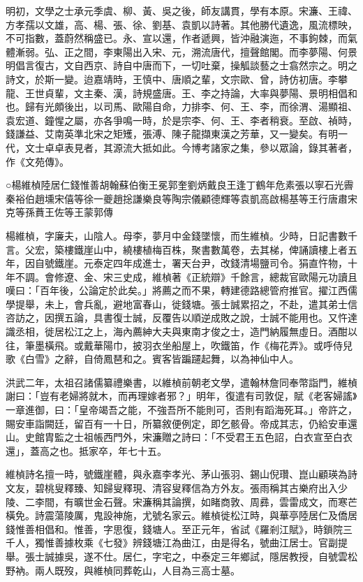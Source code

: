 
\begin{pinyinscope}
明初，文學之士承元季虞、柳、黃、吳之後，師友講貫，學有本原。宋濂、王禕、方孝孺以文雄，高、楊、張、徐、劉基、袁凱以詩著。其他勝代遺逸，風流標映，不可指數，蓋蔚然稱盛已。永、宣以還，作者遞興，皆沖融演迤，不事鉤棘，而氣體漸弱。弘、正之間，李東陽出入宋、元，溯流唐代，擅聲館閣。而李夢陽、何景明倡言復古，文自西京、詩自中唐而下，一切吐棄，操觚談藝之士翕然宗之。明之詩文，於斯一變。迨嘉靖時，王慎中、唐順之輩，文宗歐、曾，詩仿初唐。李攀龍、王世貞輩，文主秦、漢，詩規盛唐。王、李之持論，大率與夢陽、景明相倡和也。歸有光頗後出，以司馬、歐陽自命，力排李、何、王、李，而徐渭、湯顯祖、袁宏道、鐘惺之屬，亦各爭鳴一時，於是宗李、何、王、李者稍衰。至啟、禎時，錢謙益、艾南英準北宋之矩矱，張溥、陳子龍擷東漢之芳華，又一變矣。有明一代，文士卓卓表見者，其源流大抵如此。今博考諸家之集，參以眾論，錄其著者，作《文苑傳》。

○楊維楨陸居仁錢惟善胡翰蘇伯衡王冕郭奎劉炳戴良王逢丁鶴年危素張以寧石光霽秦裕伯趙壎宋僖等徐一夔趙捴謙樂良等陶宗儀顧德輝等袁凱高啟楊基等王行唐肅宋克等孫蕡王佐等王蒙郭傳

楊維楨，字廉夫，山陰人。母李，夢月中金錢墜懷，而生維楨。少時，日記書數千言。父宏，築樓鐵崖山中，繞樓植梅百株，聚書數萬卷，去其梯，俾誦讀樓上者五年，因自號鐵崖。元泰定四年成進士，署天台尹，改錢清場鹽司令。狷直忤物，十年不調。會修遼、金、宋三史成，維楨著《正統辯》千餘言，總裁官歐陽元功讀且嘆曰：「百年後，公論定於此矣。」將薦之而不果，轉建德路總管府推官。擢江西儒學提舉，未上，會兵亂，避地富春山，徙錢塘。張士誠累招之，不赴，遣其弟士信咨訪之，因撰五論，具書復士誠，反覆告以順逆成敗之說，士誠不能用也。又忤達識丞相，徙居松江之上，海內薦紳大夫與東南才俊之士，造門納履無虛日。酒酣以往，筆墨橫飛。或戴華陽巾，披羽衣坐船屋上，吹鐵笛，作《梅花弄》。或呼侍兒歌《白雪》之辭，自倚鳳琶和之。賓客皆蹁躚起舞，以為神仙中人。

洪武二年，太祖召諸儒纂禮樂書，以維楨前朝老文學，遣翰林詹同奉幣詣門，維楨謝曰：「豈有老婦將就木，而再理嫁者邪？」明年，復遣有司敦促，賦《老客婦謠》一章進御，曰：「皇帝竭吾之能，不強吾所不能則可，否則有蹈海死耳。」帝許之，賜安車詣闕廷，留百有一十日，所纂敘便例定，即乞骸骨。帝成其志，仍給安車還山。史館胄監之士祖帳西門外，宋濂贈之詩曰：「不受君王五色詔，白衣宣至白衣還」，蓋高之也。抵家卒，年七十五。

維楨詩名擅一時，號鐵崖體，與永嘉李孝光、茅山張羽、錫山倪瓚、崑山顧瑛為詩文友，碧桃叟釋臻、知歸叟釋現、清容叟釋信為方外友。張雨稱其古樂府出入少陵、二李間，有曠世金石聲。宋濂稱其論撰，如睹商敦、周彞，雲雷成文，而寒芒橫免。詩震蕩陵厲，鬼設神施，尤號名家云。維楨徙松江時，與華亭陸居仁及僑居錢惟善相倡和。惟善，字思復，錢塘人。至正元年，省試《羅剎江賦》，時鎖院三千人，獨惟善據枚乘《七發》辨錢塘江為曲江，由是得名，號曲江居士。官副提舉。張士誠據吳，遂不仕。居仁，字宅之，中泰定三年鄉試，隱居教授，自號雲松野衲。兩人既歿，與維楨同葬乾山，人目為三高士墓。


\end{pinyinscope}
